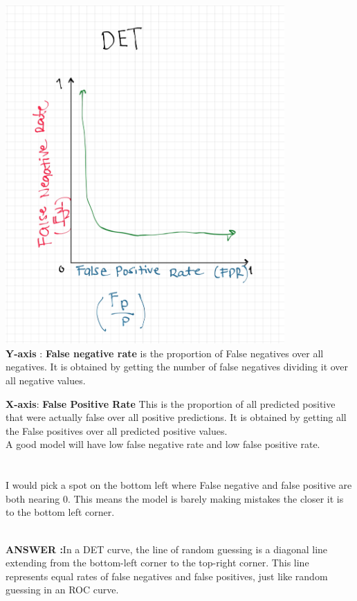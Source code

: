 \documentclass[12pt]{article}
\begin{document}
\begin{enumerate}
 \\ 
 \includegraphics[width=0.8\textwidth]{det.png} \\ 
\textbf{Y-axis} : \textbf{False negative rate} is the proportion of False negatives over all negatives. It is obtained by getting the number of false negatives dividing it over all negative values. 

\textbf{X-axis}: \textbf{False Positive Rate} This is the proportion of all predicted positive that were actually false over all positive predictions. It is obtained by getting all the False positives over all predicted positive values. \\ 

A good model will have low false negative rate and low false positive rate. \\ \\
 \\ 
I would pick a spot on the bottom left where False negative and false positive are both nearing 0. This means the model is barely making mistakes the closer it is to the bottom left corner.

\end{enumerate} \\ 
\textbf{ANSWER :}In a DET curve, the line of random guessing is a diagonal line extending from the bottom-left corner to the top-right corner. This line represents equal rates of false negatives and false positives, just like random guessing in an ROC curve.  \\
\end{document}
